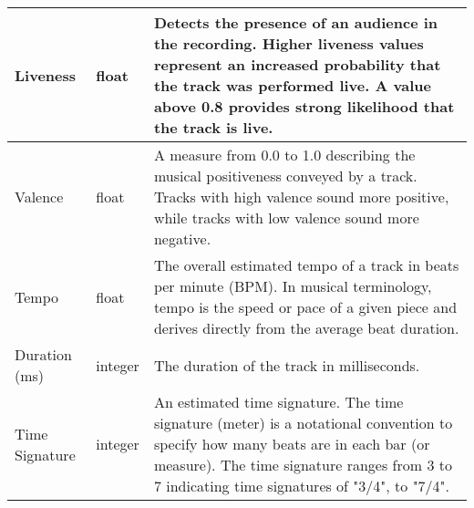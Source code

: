 \begin{table}[ht]
{\begin{tabular}{|>{\raggedright\arraybackslash}p{}|>{\raggedright\arraybackslash}p{}|>{\raggedright\arraybackslash}p{}|}
    \hline
    Liveness & float & Detects the presence of an audience in the recording. Higher liveness values represent an increased probability that the track was performed live. A value above 0.8 provides strong likelihood that the track is live. \\
    \hline
    Valence & float & A measure from 0.0 to 1.0 describing the musical positiveness conveyed by a track. Tracks with high valence sound more positive, while tracks with low valence sound more negative. \\
    \hline
    Tempo & float & The overall estimated tempo of a track in beats per minute (BPM). In musical terminology, tempo is the speed or pace of a given piece and derives directly from the average beat duration. \\
    \hline
    Duration (ms) & integer & The duration of the track in milliseconds. \\
    \hline
    Time Signature & integer & An estimated time signature. The time signature (meter) is a notational convention to specify how many beats are in each bar (or measure). The time signature ranges from 3 to 7 indicating time signatures of "3/4", to "7/4". \\
    \hline  
    \end{tabular}
    }
\end{table}